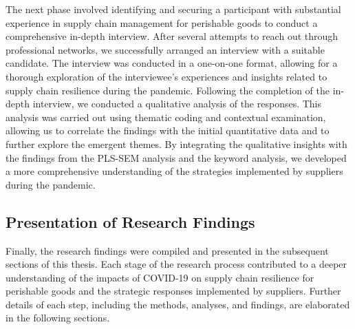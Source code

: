 The next phase involved identifying and securing a participant with substantial experience in supply chain management for perishable goods to conduct a comprehensive in-depth interview. After several attempts to reach out through professional networks, we successfully arranged an interview with a suitable candidate. The interview was conducted in a one-on-one format, allowing for a thorough exploration of the interviewee’s experiences and insights related to supply chain resilience during the pandemic. Following the completion of the in-depth interview, we conducted a qualitative analysis of the responses. This analysis was carried out using thematic coding and contextual examination, allowing us to correlate the findings with the initial quantitative data and to further explore the emergent themes. By integrating the qualitative insights with the findings from the PLS-SEM analysis and the keyword analysis, we developed a more comprehensive understanding of the strategies implemented by suppliers during the pandemic.

\subsection{Presentation of Research Findings}

Finally, the research findings were compiled and presented in the subsequent sections of this thesis. Each stage of the research process contributed to a deeper understanding of the impacts of COVID-19 on supply chain resilience for perishable goods and the strategic responses implemented by suppliers. Further details of each step, including the methods, analyses, and findings, are elaborated in the following sections.

